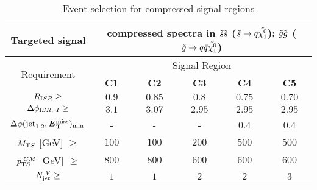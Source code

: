 {\begin{table}[tbp]
\begin{tabular}{|c|c|c|c|c|c|}
\hline
       Targeted signal & \multicolumn{5}{c|}{ compressed spectra in $\tilde{s}\tilde{s}$ ($\tilde{s} \rightarrow q \tilde{\chi^0_1}$); $\tilde{g}\tilde{g}$ ($\tilde{g} \rightarrow q\bar{q} \tilde{\chi^0_1}$) } \\
       \hline \hline
      \multirow{2}{*}{Requirement}                                             & \multicolumn{5}{c|}{Signal Region}                                                           \\
 \cline{2-6}                                                                   & \textbf{ C1} & \textbf{ C2} & \textbf{ C3} & \textbf{ C4} & \textbf{ C5} \\
\hline
$R_{\textrm ISR} \geq $                                                        & $ 0.9$           & $ 0.85$          & $ 0.8$           & $ 0.75$          & $ 0.70$          \\ \hline
$ \Delta\phi_{\textrm ISR,~I} \geq$                                            & $ 3.1$           & $ 3.07$          & $ 2.95$          & $ 2.95$          & $ 2.95$          \\ \hline
$\Delta\phi(\textrm{jet}_{\textrm 1,2},\bm{E}\mathrm{^{miss}_T})_{\text{min}} \> $ & -                & -                & -                & 0.4              & 0.4              \\ \hline
$M_{\textrm T S}$ [GeV] $\geq$                                                 & $ 100$           & $ 100$           & $ 200$           & $ 500$           & $ 500$           \\ \hline
$p_{\textrm T S}^{\textrm ~CM}$ [GeV]  $\ge$                                   & $ 800$           & $ 800$           & $ 600$           & $ 600$           & $ 600$           \\ \hline
$N_{\textrm jet}^{\textrm ~V} \geq$                                            & $ 1$             & $ 1$             & $ 2$             & $ 2$             & $ 3$             \\
\hline

\end{tabular}
\caption{Event selection for compressed signal regions
\label{tab:compressed_srs}}
\end{table}
}

